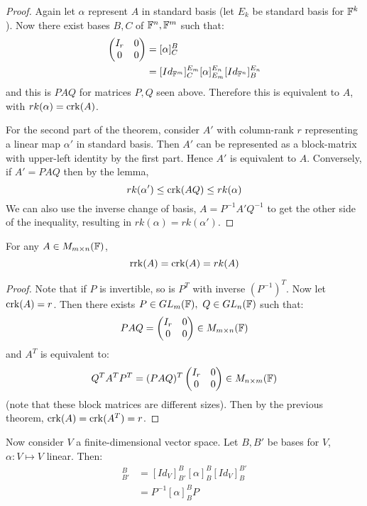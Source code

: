 \documentclass[../Main.tex]{subfiles}
\begin{document}
\begin{proof}
    Again let $\alpha$ represent $A$ in standard basis (let $E_k$ be standard basis for $\mathbb{F}^k$). Now there exist bases $B, C$ of $\mathbb{F}^n, \mathbb{F}^m$ such that:
    \begin{align*}
        \begin{pmatrix}
            I_r & 0 \\
            0 & 0
        \end{pmatrix}
        &= [\alpha]_C^B \\
        &= [Id_{\mathbb{F}^m}]_C^{E_m} [\alpha]_{E_m}^{E_n} [Id_{\mathbb{F}^n}]^{E_n}_B
    \end{align*}
    and this is $PAQ$ for matrices $P, Q$ seen above. Therefore this is equivalent to $A$, with $rk(\alpha) = \operatorname{crk}(A)$.

    For the second part of the theorem, consider $A'$ with column-rank $r$ representing a linear map $\alpha'$ in standard basis. Then $A'$ can be represented as a block-matrix with upper-left identity by the first part. Hence $A'$ is equivalent to $A$. Conversely, if $A' = PAQ$ then by the lemma,
    \begin{equation*}
        rk(\alpha') \leq \operatorname{crk}(AQ) \leq rk(\alpha)
    \end{equation*}
    We can also use the inverse change of basis, $A = P^{-1} A' Q^{-1}$ to get the other side of the inequality, resulting in $rk(\alpha) = rk(\alpha')$.
\end{proof}
\begin{theorem}
    For any $A \in M_{m \times n}(\mathbb{F})$,
    \begin{equation*}
        \operatorname{rrk}(A) = \operatorname{crk}(A) = rk(A)
    \end{equation*}
    \label{thmMatrixRank}
\end{theorem}
\begin{proof}
    Note that if $P$ is invertible, so is $P^T$ with inverse $(P^{-1})^T$. Now let $\operatorname{crk}(A) = r$. Then there exists $P \in GL_m(\mathbb{F}),~Q \in GL_n(\mathbb{F})$ such that:
    \begin{equation*}
        PAQ =
        \begin{pmatrix}
            I_r & 0 \\
            0 & 0
        \end{pmatrix}
        \in M_{m \times n}(\mathbb{F})
    \end{equation*}
    and $A^T$ is equivalent to:
    \begin{equation*}
        Q^TA^TP^T = (PAQ)^T
        \begin{pmatrix}
            I_r & 0 \\
            0 & 0
        \end{pmatrix}
        \in M_{n \times m}(\mathbb{F})
    \end{equation*}
    (note that these block matrices are different sizes).
    Then by the previous theorem, $\operatorname{crk}(A) = \operatorname{crk}(A^T) = r$.
\end{proof}
Now consider $V$ a finite-dimensional vector space. Let $B, B'$ be bases for $V$, $\alpha : V \mapsto V$ linear. Then:
\begin{align*}
    [\alpha]_{B'}^B &= [Id_V]_{B'}^B [\alpha]_B^B [Id_V]_B^{B'} \\
    &= P^{-1} [\alpha]_B^B P
\end{align*}
\end{document}
